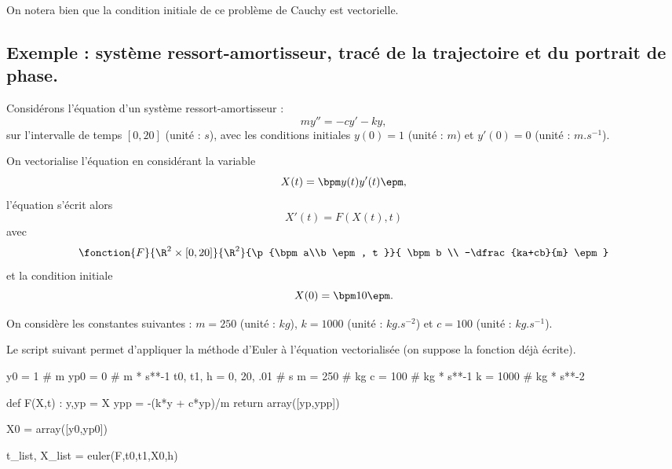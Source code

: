 \begin{rem}
    On notera bien que la condition initiale de ce problème de Cauchy est vectorielle. 
\end{rem}

\subsection{Exemple : système ressort-amortisseur, tracé de la trajectoire et du portrait de phase.}

Considérons l'équation d'un système ressort-amortisseur : 
\begin{equation*}
  m y'' = - c y' - ky,
\end{equation*}
sur l'intervalle de temps $[0,20]$ (unité : $s$), avec les conditions initiales $y(0) = 1$ (unité : $m$) et $y'(0) = 0$ (unité : $m.s^{-1}$).

On vectorialise l'équation en considérant la variable 
\begin{equation*}
    X(t) = \bpm y(t) \\ y'(t) \epm,
\end{equation*}
l'équation s'écrit alors 
\begin{equation*}
    X'(t) = F(X(t),t)
\end{equation*}
avec 
\begin{equation*}
    \fonction{F}{\R^2\times [0,20] }{\R^2}{\p{\bpm a\\b \epm , t }}{ \bpm b \\ -\dfrac{ka+cb}{m} \epm}
\end{equation*}
et la condition initiale
\begin{equation*}
    X(0) = \bpm 1\\0 \epm. 
\end{equation*}


On considère les constantes suivantes : $m = 250$ (unité : $kg$), $k = 1000$ (unité : $kg.s^{-2}$) et $c = 100$ (unité : $kg.s^{-1}$).

Le script suivant permet d'appliquer la méthode d'Euler à l'équation vectorialisée (on suppose la fonction  déjà écrite). 
\begin{pyverbatim}
y0 = 1 # m
yp0 = 0 # m * s**-1
t0, t1, h = 0, 20, .01 # s
m = 250 # kg
c = 100 # kg * s**-1
k = 1000 # kg * s**-2

def F(X,t) :
    y,yp = X
    ypp = -(k*y + c*yp)/m
    return array([yp,ypp])

X0 = array([y0,yp0])

t_list, X_list = euler(F,t0,t1,X0,h)
\end{pyverbatim}


